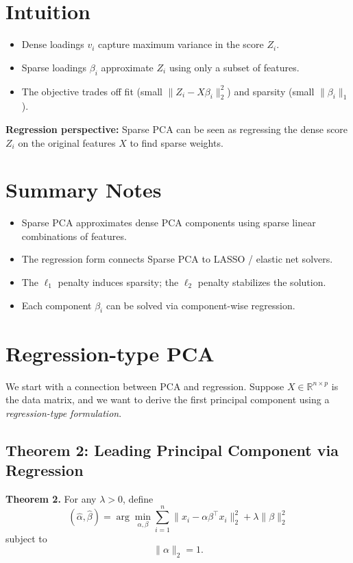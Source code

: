 \documentclass[12pt]{article}
\begin{document}
\section{Intuition}

\begin{itemize}
    \item Dense loadings $v_i$ capture maximum variance in the score $Z_i$.
    \item Sparse loadings $\beta_i$ approximate $Z_i$ using only a subset of features.
    \item The objective trades off fit (small $\|Z_i - X\beta_i\|_2^2$) and sparsity (small $\|\beta_i\|_1$).
\end{itemize}

\noindent
\textbf{Regression perspective:} Sparse PCA can be seen as regressing the dense score $Z_i$ on the original features $X$ to find sparse weights.

\section{Summary Notes}

\begin{itemize}
    \item Sparse PCA approximates dense PCA components using sparse linear combinations of features.
    \item The regression form connects Sparse PCA to LASSO / elastic net solvers.
    \item The $\ell_1$ penalty induces sparsity; the $\ell_2$ penalty stabilizes the solution.
    \item Each component $\beta_i$ can be solved via component-wise regression.
\end{itemize}

\section{Regression-type PCA}

We start with a connection between PCA and regression. Suppose $X \in \mathbb{R}^{n \times p}$ is the data matrix, and we want to derive the first principal component using a \emph{regression-type formulation}.

\subsection{Theorem 2: Leading Principal Component via Regression}
\textbf{Theorem 2.} For any $\lambda > 0$, define
\[
(\hat{\alpha}, \hat{\beta}) = \arg \min_{\alpha, \beta} \sum_{i=1}^n \| x_i - \alpha \beta^\top x_i \|_2^2 + \lambda \|\beta\|_2^2
\]
subject to 
\[
\|\alpha\|_2 = 1.
\]
\end{document}
